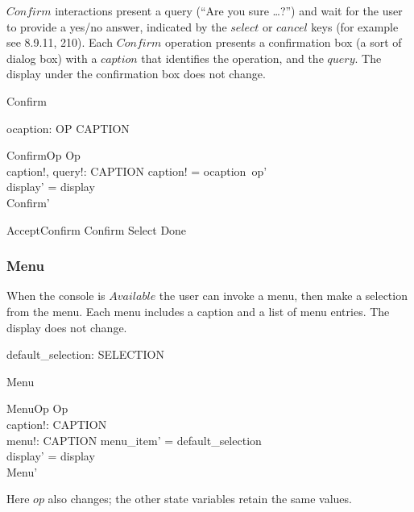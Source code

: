$Confirm$ interactions present a query (``Are you sure \dots ?'')  and
wait for the user to provide a yes/no answer, indicated by the
$select$ or $cancel$ keys (for example see 8.9.11, 210).  Each
$Confirm$ operation presents a confirmation box (a sort of dialog box)
with a $caption$ that identifies the operation, and the $query$.  The
display under the confirmation box does not change.
	
\begin{zed}
	Confirm 
\end{zed}

\begin{axdef} 
	ocaption: OP \fun CAPTION \\
\end{axdef}

\begin{schema}{ConfirmOp}
	Op \\
	caption!, query!: CAPTION
\where	
	caption! = ocaption~op' \\
	display' = display \\
	Confirm' \\
\end{schema}
	
\begin{zed}
	AcceptConfirm  Confirm \land Select \land Done
\end{zed}

\subsubsection{Menu}

When the console is $Available$ the user can invoke a menu, then make
a selection from the menu.  Each menu includes a caption and a list of
menu entries. The display does not change.

\begin{axdef}
	default\_selection: SELECTION
\end{axdef}

\begin{zed}Menu  \end{zed}

\begin{schema}{MenuOp}
	Op \\
	caption!: CAPTION \\
	menu!: \iseq CAPTION
\where
	menu\_item' = default\_selection \\
	display' = display \\
	Menu'
\end{schema}
Here $op$ also changes; the other state variables retain the same
values.  

